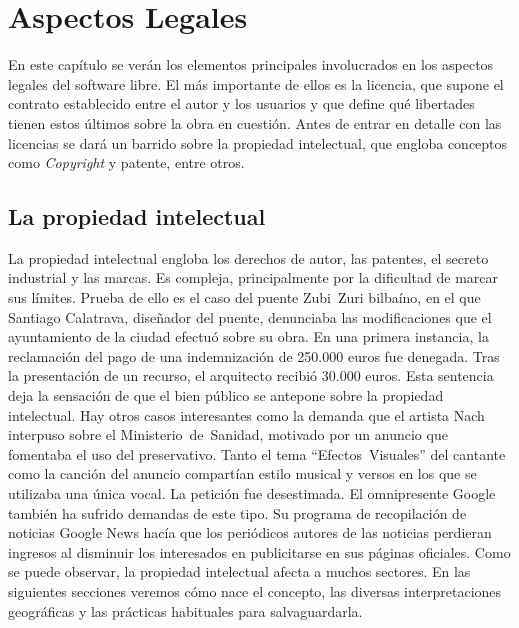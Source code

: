 %
%

\chapter{Aspectos Legales}
\label{CHAP2:LegalAspects}
En este capítulo se verán los elementos principales involucrados en
los aspectos legales del software libre. El más importante de ellos es
la licencia, que supone el contrato establecido entre el autor y los
usuarios y que define qué libertades tienen estos últimos sobre la
obra en cuestión. Antes de entrar en detalle con las licencias se dará
un barrido sobre la propiedad intelectual, que engloba conceptos como
\emph{Copyright} y patente, entre otros.

\section{La propiedad intelectual}
La propiedad intelectual engloba los derechos de autor, las patentes,
el secreto industrial y las marcas. Es compleja, principalmente por la
dificultad de marcar sus límites. Prueba de ello es el caso del puente
Zubi~Zuri bilbaíno, en el que Santiago Calatrava, diseñador del
puente, denunciaba las modificaciones que el ayuntamiento de la ciudad
efectuó sobre su obra. En una primera instancia, la reclamación del
pago de una indemnización de 250.000 euros fue denegada. Tras la
presentación de un recurso, el arquitecto recibió 30.000 euros. Esta
sentencia deja la sensación de que el bien público se antepone sobre
la propiedad intelectual. Hay otros casos interesantes como la demanda
que el artista Nach interpuso sobre el Ministerio~de~Sanidad, motivado
por un anuncio que fomentaba el uso del preservativo. Tanto el tema
``Efectos~Visuales'' del cantante como la canción del anuncio
compartían estilo musical y versos en los que se utilizaba una única
vocal. La petición fue desestimada. El omnipresente Google también ha
sufrido demandas de este tipo. Su programa de recopilación de noticias
Google News hacía que los periódicos autores de las noticias perdieran
ingresos al disminuir los interesados en publicitarse en sus páginas
oficiales. Como se puede observar, la propiedad intelectual afecta a
muchos sectores. En las siguientes secciones veremos cómo nace el
concepto, las diversas interpretaciones geográficas y las prácticas
habituales para salvaguardarla.

